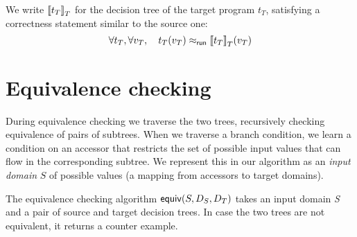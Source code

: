 \documentclass[12pt]{article}
\begin{document}
We write ${\llbracket{t_T}\rrbracket}_T$ for the decision tree of the target program
$t_T$, satisfying a correctness statement similar to the source one:
\[
\forall t_T, \forall v_T, \quad t_T(v_T) \mathrel{\approx_{\mathsf{run}}} {\llbracket{t_T}\rrbracket}_T(v_T)
\]

\section{Equivalence checking}

During equivalence checking we traverse the two trees, recursively checking equivalence of pairs of subtrees.
When we traverse a branch condition, we learn a condition
on an accessor that restricts the set of possible input values that can flow in the corresponding subtree.
We represent this in our algorithm as an \emph{input domain} $S$ of possible values (a mapping from accessors to target domains).

The equivalence checking algorithm $\mathsf{equiv}(S, D_S, D_T)$ takes an input domain \emph{S} and a pair of source and target decision trees. In case the two trees are not equivalent, it returns a counter example.
\end{document}
